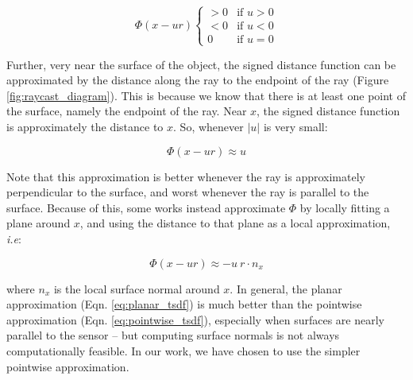 \documentclass[conference,10pt]{IEEEtran}
\begin{document}
$$ \Phi(x - ur) 
     \begin{cases}
     > 0 & \text{if } u > 0 \\
     < 0 & \text{if } u < 0 \\
     0 & \text{if } u = 0
     \end{cases}
     $$

Further, very near the surface of the object, the signed distance function can
be approximated by the distance along the ray to the endpoint of  the ray
(Figure \ref{fig:raycast_diagram}). This is because we know that there is at
least one point of the surface, namely the endpoint of the ray.  Near $x$, the
signed distance function is approximately the distance to $x$. So, whenever
$|u|$ is very small:

\begin{equation} \label{eq:pointwise_tsdf} \Phi(x - ur) \approx u \end{equation}

Note that this approximation is better whenever the ray is approximately
perpendicular to the surface, and worst whenever the ray is parallel to the
surface. Because of this, some works \cite{Bylow2013} instead approximate
$\Phi$ by locally fitting a plane around $x$, and using the distance to that
plane as a local approximation, \emph{i.e}:

\begin{equation} \label{eq:planar_tsdf} \Phi(x - ur) \approx -u~r \cdot n_x
\end{equation}

\noindent where $n_x$ is the local surface normal around $x$. In general, the
planar approximation (Eqn. \ref{eq:planar_tsdf}) is much better than the
pointwise approximation (Eqn. \ref{eq:pointwise_tsdf}), especially when surfaces
are nearly parallel to the sensor -- but computing surface normals is not
always computationally feasible. In our work, we have chosen to use
the simpler pointwise approximation.
\end{document}
